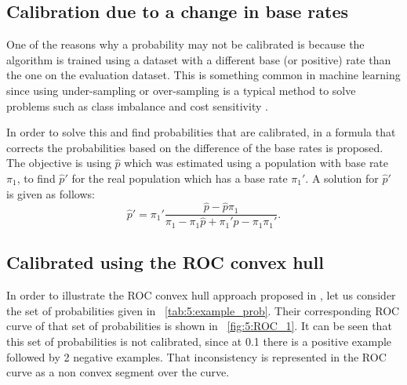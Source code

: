 \subsection{Calibration due to a change in base rates}

One of the reasons why a probability may not be calibrated is because the algorithm is trained using 
a dataset with a different base (or positive) rate than the one on the evaluation dataset.  This is 
something common in machine learning since using under-sampling or over-sampling is a typical method 
to solve problems such as class imbalance and cost sensitivity \citep{Hulse2007}.
  
In order to solve this and find probabilities that are calibrated, in \citep{Elkan2001} a formula  
that corrects the probabilities based on the difference of the base rates is proposed.  The 
objective is using $\hat p$ which was estimated using a population with base rate $\pi_1$,
to find $\hat p'$ for the real population which has a base rate $\pi_1'$. A solution for $\hat p'$ 
is given as follows:
\begin{equation}
  \hat p'=\pi_1' \frac{\hat p - \hat p \pi_1}{\pi_1- \pi_1 \hat p +\pi_1' \hat p - \pi_1 \pi_1'}.
\end{equation}

  
\subsection{Calibrated using the ROC convex hull}

In order to illustrate the ROC convex hull approach proposed in \citep{Hernandez-Orallo2012},
let us consider the set of probabilities given in \figurename{~\ref{tab:5:example_prob}}.
Their corresponding  ROC curve of that set of probabilities is shown in 
\figurename{~\ref{fig:5:ROC_1}}.  It can be seen that this set of probabilities is not calibrated, 
since at 0.1 there is a positive example  followed by 2 negative examples. That inconsistency is 
represented in the ROC curve as a non convex segment  over the curve.
  
